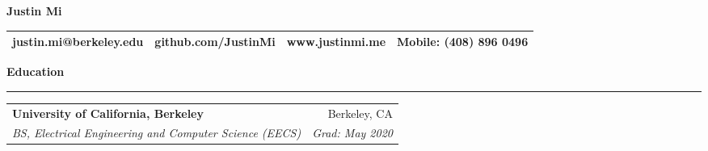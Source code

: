 \documentclass[11pt,letterpaper]{article}
\makeatletter
\newenvironment{topic}[1]
    {
    {\Large \centerline{#1}}
    \vspace*{0.03in}
    \hrule 
    \vspace*{0.05in}
    }
    {}
\newenvironment{event}
    {
    \begin{tabular*}{\textwidth}{l@{\extracolsep{\fill}}r}
    }
    {
    \end{tabular*}
    }
\newenvironment{detail}
    {
    \normalsize
    }
    {
    \vspace*{0.02in}
    }
\newenvironment{head}
    {
    \begin{center}
    \begin{tabular*}{\textwidth}{@{\extracolsep{\fill}} l c c r}
    }
    {
    \hline
    \hline
    \end{tabular*}
    \end{center}
    }
\makeatother
\begin{document}
    \begin{center}
        \huge{\textbf{Justin Mi}}
    \end{center}
    \begin{head}
    justin.mi@berkeley.edu  & github.com/JustinMi & www.justinmi.me & Mobile: (408) 896 0496 \\
    \end{head}


    \begin{topic}{\textbf{Education}}
        \begin{event}
            \textbf{University of California, Berkeley} & Berkeley, CA \\
            \emph{BS, Electrical Engineering and Computer Science (EECS)} & \emph{Grad: May 2020}        
        \end{event}
    \end{topic} \vspace*{-0.1in}
\end{document}
